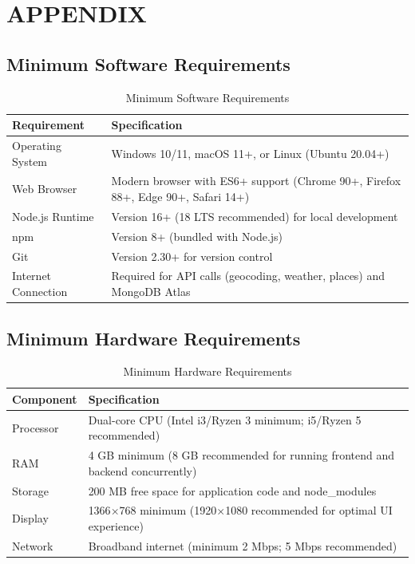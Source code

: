 \chapter{APPENDIX}

\section{Minimum Software Requirements}
\begin{table}[H]
    \centering
    \renewcommand{\arraystretch}{1.4}
    \begin{tabular}{|p{4cm}|p{9cm}|}
        \hline
        \textbf{Requirement} & \textbf{Specification} \\
        \hline
        Operating System & Windows 10/11, macOS 11+, or Linux (Ubuntu 20.04+) \\
        \hline
        Web Browser & Modern browser with ES6+ support (Chrome 90+, Firefox 88+, Edge 90+, Safari 14+) \\
        \hline
        Node.js Runtime & Version 16+ (18 LTS recommended) for local development \\
        \hline
        npm & Version 8+ (bundled with Node.js) \\
        \hline
        Git & Version 2.30+ for version control \\
        \hline
        Internet Connection & Required for API calls (geocoding, weather, places) and MongoDB Atlas \\
        \hline
    \end{tabular}
    \caption{Minimum Software Requirements}
    \label{tab:sw_req}
\end{table}

\section{Minimum Hardware Requirements}
\begin{table}[H]
    \centering
    \renewcommand{\arraystretch}{1.4}
    \begin{tabular}{|p{4cm}|p{9cm}|}
        \hline
        \textbf{Component} & \textbf{Specification} \\
        \hline
        Processor & Dual-core CPU (Intel i3/Ryzen 3 minimum; i5/Ryzen 5 recommended) \\
        \hline
        RAM & 4 GB minimum (8 GB recommended for running frontend and backend concurrently) \\
        \hline
        Storage & 200 MB free space for application code and node\_modules \\
        \hline
        Display & 1366$\times$768 minimum (1920$\times$1080 recommended for optimal UI experience) \\
        \hline
        Network & Broadband internet (minimum 2 Mbps; 5 Mbps recommended) \\
        \hline
    \end{tabular}
    \caption{Minimum Hardware Requirements}
    \label{tab:hw_req}
\end{table}

